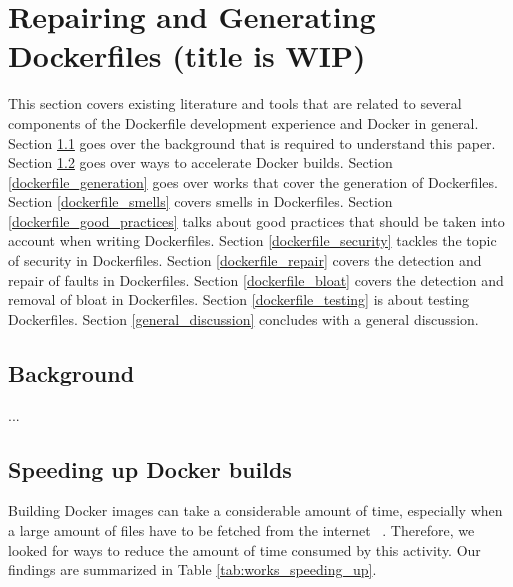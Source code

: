 \chapter{Repairing and Generating Dockerfiles (title is WIP)} \label{chap:sota}

This section covers existing literature and tools that are related to several components of the Dockerfile development experience and Docker in general. Section \ref{background} goes over the background that is required to understand this paper. Section \ref{speeding_up_docker_builds} goes over ways to accelerate Docker builds. Section \ref{dockerfile_generation} goes over works that cover the generation of Dockerfiles. Section \ref{dockerfile_smells} covers smells in Dockerfiles. Section \ref{dockerfile_good_practices} talks about good practices that should be taken into account when writing Dockerfiles. Section \ref{dockerfile_security} tackles the topic of security in Dockerfiles. Section \ref{dockerfile_repair} covers the detection and repair of faults in Dockerfiles. Section \ref{dockerfile_bloat} covers the detection and removal of bloat in Dockerfiles. Section \ref{dockerfile_testing} is about testing Dockerfiles. Section \ref{general_discussion} concludes with a general discussion.

\section{Background} \label{background}
...
\section{Speeding up Docker builds} \label{speeding_up_docker_builds}

Building Docker images can take a considerable amount of time, especially when a large amount of files have to be fetched from the internet ~\citep{harterSlackerFastDistribution}. Therefore, we looked for ways to reduce the amount of time consumed by this activity. Our findings are summarized in Table \ref{tab:works_speeding_up}.

